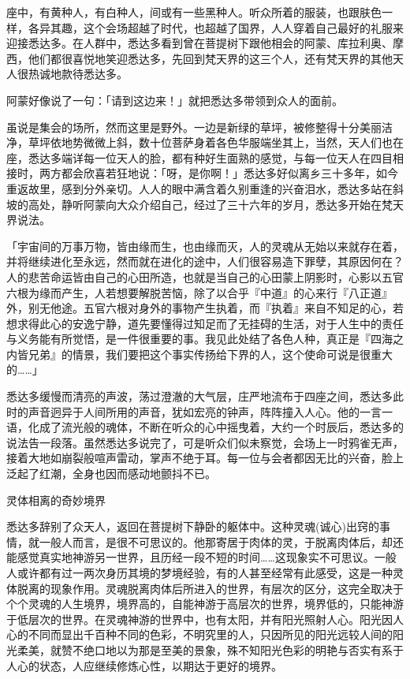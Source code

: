 \documentclass[12pt,twoside,openany]{book}
\begin{document}
座中，有黄种人，有白种人，间或有一些黑种人。听众所着的服装，也跟肤色一样，各异其趣，这个会场超越了时代，也超越了国界，人人穿着自己最好的礼服来迎接悉达多。在人群中，悉达多看到曾在菩提树下跟他相会的阿蒙、库拉利奥、摩西，他们都很喜悦地笑迎悉达多，先回到梵天界的这三个人，还有梵天界的其他天人很热诚地款待悉达多。

阿蒙好像说了一句：「请到这边来！」就把悉达多带领到众人的面前。

虽说是集会的场所，然而这里是野外。一边是新绿的草坪，被修整得十分美丽洁净，草坪依地势微微上斜，数十位菩萨身着各色华服端坐其上，当然，天人们也在座，悉达多端详每一位天人的脸，都有种好生面熟的感觉，与每一位天人在四目相接时，两方都会欣喜若狂地说：「呀，是你啊！」悉达多好似离乡三十多年，如今重返故里，感到分外亲切。人人的眼中满含着久别重逢的兴奋泪水，悉达多站在斜坡的高处，静听阿蒙向大众介绍自己，经过了三十六年的岁月，悉达多开始在梵天界说法。

「宇宙间的万事万物，皆由缘而生，也由缘而灭，人的灵魂从无始以来就存在着，并将继续进化至永远，然而就在进化的途中，人们很容易造下罪孽，其原因何在？人的悲苦命运皆由自己的心田所造，也就是当自己的心田蒙上阴影时，心影以五官六根为缘而产生，人若想要解脱苦恼，除了以合乎『中道』的心来行『八正道』外，别无他途。五官六根对身外的事物产生执着，而『执着』来自不知足的心，若想求得此心的安逸宁静，道先要懂得过知足而了无挂碍的生活，对于人生中的责任与义务能有所觉悟，是一件很重要的事。我见此处结了各色人种，真正是『四海之内皆兄弟』的情景，我们要把这个事实传扬给下界的人，这个使命可说是很重大的……」

悉达多缓慢而清亮的声波，荡过澄澈的大气层，庄严地流布于四座之间，悉达多此时的声音迥异于人间所用的声音，犹如宏亮的钟声，阵阵撞入人心。他的一言一语，化成了流光般的魂体，不断在听众的心中摇曳着，大约一个时辰后，悉达多的说法告一段落。虽然悉达多说完了，可是听众们似未察觉，会场上一时鸦雀无声，接着大地如崩裂般喧声雷动，掌声不绝于耳。每一位与会者都因无比的兴奋，脸上泛起了红潮，全身也因而感动地颤抖不已。

灵体相离的奇妙境界

悉达多辞别了众天人，返回在菩提树下静卧的躯体中。这种灵魂(诚心)出窍的事情，就一般人而言，是很不可思议的。他那寄居于肉体的灵，于脱离肉体后，却还能感觉真实地神游另一世界，且历经一段不短的时间……这现象实不可思议。一般人或许都有过一两次身历其境的梦境经验，有的人甚至经常有此感受，这是一种灵体脱离的现象作用。灵魂脱离肉体后所进入的世界，有层次的区分，这完全取决于个个灵魂的人生境界，境界高的，自能神游于高层次的世界，境界低的，只能神游于低层次的世界。在灵魂神游的世界中，也有太阳，并有阳光照射人心。阳光因人心的不同而显出千百种不同的色彩，不明究里的人，只因所见的阳光远较人间的阳光柔美，就赞不绝口地以为那是至美的景象，殊不知阳光色彩的明艳与否实有系于人心的状态，人应继续修炼心性，以期达于更好的境界。
\end{document}
